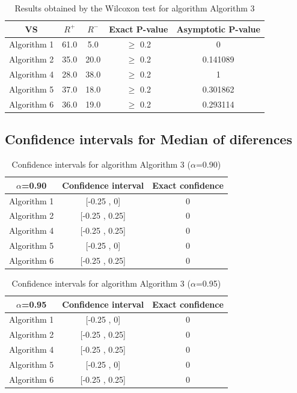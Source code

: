\documentclass[a4paper,10pt]{article}
\begin{document}
\begin{table}[!htp]
\centering\small
\begin{tabular}{
|c|c|c|c|c|}
\hline
 VS & $R^{+}$ & $R^{-}$ & Exact P-value & Asymptotic P-value \\ \hline 
Algorithm 1 & 61.0 & 5.0 & $\geq$ 0.2 & 0\\ \hline 
Algorithm 2 & 35.0 & 20.0 & $\geq$ 0.2 & 0.141089\\ \hline 
Algorithm 4 & 28.0 & 38.0 & $\geq$ 0.2 & 1\\ \hline 
Algorithm 5 & 37.0 & 18.0 & $\geq$ 0.2 & 0.301862\\ \hline 
Algorithm 6 & 36.0 & 19.0 & $\geq$ 0.2 & 0.293114\\ \hline 

\end{tabular}
\caption{Results obtained by the Wilcoxon test for algorithm Algorithm 3}
\end{table}

\subsection{Confidence intervals for Median of diferences}

\begin{table}[!htp]
\centering\small
\begin{tabular}{
|c|c|c|}
\hline
 $\alpha$=0.90 & Confidence interval & Exact confidence \\ \hline 
Algorithm 1 & [-0.25 , 0] & 0\\ \hline 
Algorithm 2 & [-0.25 , 0.25] & 0\\ \hline 
Algorithm 4 & [-0.25 , 0.25] & 0\\ \hline 
Algorithm 5 & [-0.25 , 0] & 0\\ \hline 
Algorithm 6 & [-0.25 , 0.25] & 0\\ \hline 

\end{tabular}
\caption{Confidence intervals for algorithm Algorithm 3 ($\alpha$=0.90)}
\end{table}
\begin{table}[!htp]
\centering\small
\begin{tabular}{
|c|c|c|}
\hline
 $\alpha$=0.95 & Confidence interval & Exact confidence \\ \hline 
Algorithm 1 & [-0.25 , 0] & 0\\ \hline 
Algorithm 2 & [-0.25 , 0.25] & 0\\ \hline 
Algorithm 4 & [-0.25 , 0.25] & 0\\ \hline 
Algorithm 5 & [-0.25 , 0] & 0\\ \hline 
Algorithm 6 & [-0.25 , 0.25] & 0\\ \hline 

\end{tabular}
\caption{Confidence intervals for algorithm Algorithm 3 ($\alpha$=0.95)}
\end{table}
\end{document}
